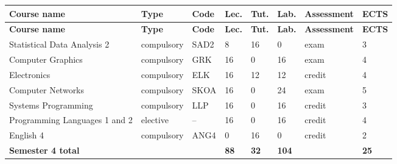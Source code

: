\documentclass[12pt,a4paper]{article}
\newcommand{\thdrule}{\noalign{\global\setlength{\extrarowheight}{0pt}}}
\newcommand{\thdend}{\noalign{\global\setlength{\extrarowheight}{4pt}}}
\begin{document}
{\scriptsize
\begin{longtable}{m{5.0cm}m{1.9cm}m{0.75cm}m{0.85cm}m{0.85cm}m{0.85cm}m{1.45cm}m{0.9cm}}
\thdrule\toprule
\rowcolor{pjatkRed}
{\color{white}\footnotesize\textbf{\vphantom{Ag}Course name}} & {\color{white}\footnotesize\textbf{\vphantom{Ag}Type}} & {\color{white}\footnotesize\textbf{\vphantom{Ag}Code}} & {\color{white}\footnotesize\textbf{\vphantom{Ag}Lec.}} & {\color{white}\footnotesize\textbf{\vphantom{Ag}Tut.}} & {\color{white}\footnotesize\textbf{\vphantom{Ag}Lab.}} & {\color{white}\footnotesize\textbf{\vphantom{Ag}Assessment}} & {\color{white}\footnotesize\textbf{\vphantom{Ag}ECTS}} \\
\midrule\thdend
\endfirsthead
\thdrule\toprule
\rowcolor{pjatkRed}
{\color{white}\footnotesize\textbf{\vphantom{Ag}Course name}} & {\color{white}\footnotesize\textbf{\vphantom{Ag}Type}} & {\color{white}\footnotesize\textbf{\vphantom{Ag}Code}} & {\color{white}\footnotesize\textbf{\vphantom{Ag}Lec.}} & {\color{white}\footnotesize\textbf{\vphantom{Ag}Tut.}} & {\color{white}\footnotesize\textbf{\vphantom{Ag}Lab.}} & {\color{white}\footnotesize\textbf{\vphantom{Ag}Assessment}} & {\color{white}\footnotesize\textbf{\vphantom{Ag}ECTS}} \\
\midrule\thdend
\endhead
\rowcolor{tableRowLight} Statistical Data Analysis 2 & {\scriptsize compulsory} & SAD2 & 8 & 16 & 0 & {\scriptsize exam} & 3 \\
\rowcolor{tableRowAlt} Computer Graphics & {\scriptsize compulsory} & GRK & 16 & 0 & 16 & {\scriptsize exam} & 4 \\
\rowcolor{tableRowLight} Electronics & {\scriptsize compulsory} & ELK & 16 & 12 & 12 & {\scriptsize credit} & 4 \\
\rowcolor{tableRowAlt} Computer Networks & {\scriptsize compulsory} & SKOA & 16 & 0 & 24 & {\scriptsize exam} & 5 \\
\rowcolor{tableRowLight} Systems Programming & {\scriptsize compulsory} & LLP & 16 & 0 & 16 & {\scriptsize credit} & 3 \\
\rowcolor{tableElective} Programming Languages 1 and 2 & {\scriptsize elective} & -- & 16 & 0 & 16 & {\scriptsize credit} & 4 \\
\rowcolor{tableRowAlt} English 4 & {\scriptsize compulsory} & ANG4 & 0 & 16 & 0 & {\scriptsize credit} & 2 \\
\midrule[\heavyrulewidth]
\rowcolor{tableSummary} \textbf{Semester 4 total} & & & \textbf{88} & \textbf{32} & \textbf{104} & & \textbf{25} \\
\bottomrule
\end{longtable}}
\end{document}
